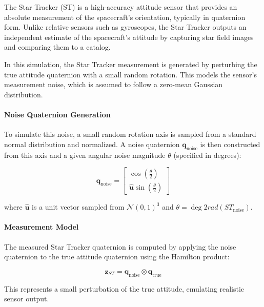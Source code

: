 

The Star Tracker (ST) is a high-accuracy attitude sensor that provides an absolute measurement of the spacecraft's orientation, typically in quaternion form. Unlike relative sensors such as gyroscopes, the Star Tracker outputs an independent estimate of the spacecraft’s attitude by capturing star field images and comparing them to a catalog.

In this simulation, the Star Tracker measurement is generated by perturbing the true attitude quaternion with a small random rotation. This models the sensor's measurement noise, which is assumed to follow a zero-mean Gaussian distribution.

\paragraph{Noise Quaternion Generation}

To simulate this noise, a small random rotation axis is sampled from a standard normal distribution and normalized. A noise quaternion $\mathbf{q}_{\text{noise}}$ is then constructed from this axis and a given angular noise magnitude $\theta$ (specified in degrees):

\begin{equation}
    \mathbf{q}_{\text{noise}} = 
    \begin{bmatrix}
        \cos\left(\frac{\theta}{2}\right) \\
        \hat{\mathbf{u}} \sin\left(\frac{\theta}{2}\right)
    \end{bmatrix}
\end{equation}

where $\hat{\mathbf{u}}$ is a unit vector sampled from $\mathcal{N}(0,1)^3$ and $\theta = \deg2rad(ST_{\text{noise}})$.

\paragraph{Measurement Model}

The measured Star Tracker quaternion is computed by applying the noise quaternion to the true attitude quaternion using the Hamilton product:

\begin{equation}
    \mathbf{z}_{ST} = \mathbf{q}_{\text{noise}} \otimes \mathbf{q}_{\text{true}}
\end{equation}

This represents a small perturbation of the true attitude, emulating realistic sensor output.

